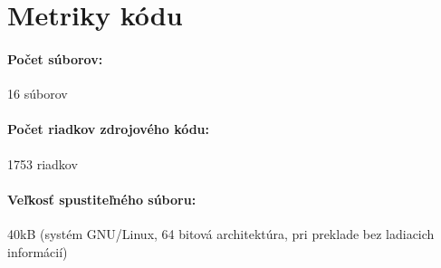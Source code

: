 \documentclass[12pt,a4paper,titlepage]{article}
\begin{document}
\newpage
{} %



\appendix
\section{Metriky kódu}
\paragraph{Počet súborov:} 16 súborov
\paragraph{Počet riadkov zdrojového kódu:} 1753 riadkov
\paragraph{Veľkosť spustiteľného súboru:} 40kB (systém GNU/Linux, 64 bitová architektúra,
    pri preklade bez ladiacich informácií)
\end{document}
